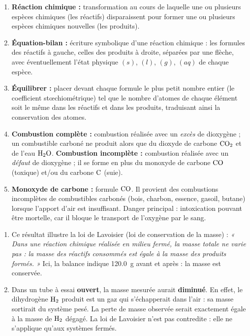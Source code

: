\documentclass[11pt]{article}
\newcommand{\cle}[1]{{\popxbold\color{popdark}#1}}
\begin{document}
\begin{corrige}
\begin{enumerate}
    \item \textbf{Réaction chimique :} transformation au cours de laquelle une ou plusieurs espèces chimiques (les \cle{réactifs}) disparaissent pour former une ou plusieurs espèces chimiques nouvelles (les \cle{produits}).
    \item \textbf{Équation-bilan :} écriture symbolique d'une réaction chimique : les formules des réactifs à gauche, celles des produits à droite, séparées par une flèche, avec éventuellement l'état physique $(s)$, $(l)$, $(g)$, $(aq)$ de chaque espèce.
    \item \textbf{Équilibrer :} placer devant chaque formule le plus petit nombre entier (le \cle{coefficient stœchiométrique}) tel que le nombre d'atomes de chaque élément soit le même dans les réactifs et dans les produits, traduisant ainsi la conservation des atomes.
    \item \textbf{Combustion complète :} combustion réalisée avec un \emph{excès} de dioxygène ; un combustible carboné ne produit alors que du dioxyde de carbone $\ce{CO2}$ et de l'eau $\ce{H2O}$. \textbf{Combustion incomplète :} combustion réalisée avec un \emph{défaut} de dioxygène ; il se forme en plus du monoxyde de carbone $\ce{CO}$ (toxique) et/ou du carbone $\ce{C}$ (suie).
    \item \textbf{Monoxyde de carbone :} formule $\ce{CO}$. Il provient des combustions incomplètes de combustibles carbonés (bois, charbon, essence, gasoil, butane) lorsque l'apport d'air est insuffisant. Danger principal : intoxication pouvant être mortelle, car il bloque le transport de l'oxygène par le sang.
\end{enumerate}
\end{corrige}

\begin{corrige}
\begin{enumerate}
    \item Ce résultat illustre la \cle{loi de Lavoisier} (loi de conservation de la masse) : \emph{« Dans une réaction chimique réalisée en milieu fermé, la masse totale ne varie pas : la masse des réactifs consommés est égale à la masse des produits formés. »} Ici, la balance indique \SI{120,0}{g} avant et après : la masse est conservée.
    \item Dans un tube à essai \textbf{ouvert}, la masse mesurée aurait \textbf{diminué}. En effet, le dihydrogène $\ce{H2}$ produit est un gaz qui s'échapperait dans l'air : sa masse sortirait du système pesé. La perte de masse observée serait exactement égale à la masse de $\ce{H2}$ dégagé. La loi de Lavoisier n'est pas contredite : elle ne s'applique qu'aux systèmes fermés.
\end{enumerate}
\end{corrige}
\end{document}
